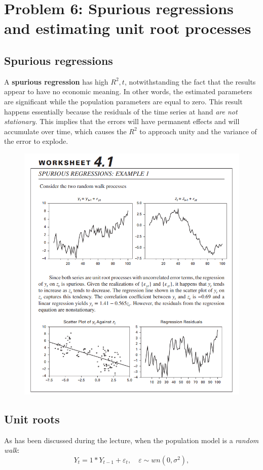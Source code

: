 \documentclass[11pt, a4paper]{report}
\theoremstyle{plain}
\theoremstyle{plain}
\theoremstyle{remark}
\begin{document}
\chapter{Problem 6: Spurious regressions and estimating unit root processes}

\section{Spurious regressions}

A \textbf{spurious regression} has high $R^2, t$, notwithstanding the fact that the results appear to have no economic meaning. In other words, the estimated parameters are significant while the population parameters are equal to zero. This result happens essentially because the residuals of the time series at hand \textit{are not stationary.} This implies that the errors will have permanent effects and will accumulate over time, which causes the $R^2$ to approach unity and the variance of the error to explode.

\begin{figure}
\centering
\includegraphics[width=0.6\linewidth]{"spurious regression example"}
\label{fig:spurious-regression-example}
\end{figure}



\section{Unit roots}

As has been discussed during the lecture, when the population model is a
\emph{random walk}:
\[ Y_t = 1*Y_{t-1} + \varepsilon_t, \hspace{1em} \varepsilon \sim wn(0, \sigma^2), \]
\end{document}
